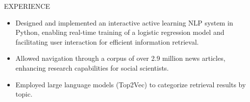 \documentclass{resume} %
\begin{document}
\begin{rSection}{EXPERIENCE}
\begin{itemize}
   \item Designed and implemented an interactive active learning NLP system in Python, enabling real-time training of a logistic regression model and facilitating user interaction for efficient information retrieval.\vspace{-0.2cm}
   \item Allowed navigation through a corpus of over 2.9 million news articles, enhancing research capabilities for social scientists.\vspace{-0.2cm}
   \item Employed large language models (Top2Vec) to categorize retrieval results by topic.
\end{itemize}

    




\end{rSection}
\end{document}
